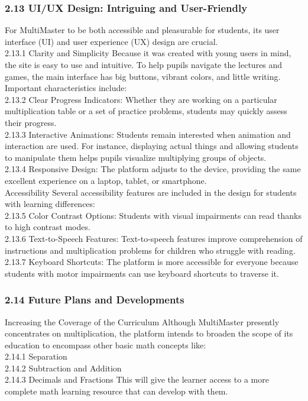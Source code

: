 \documentclass[BTech]{audiss}
\begin{document}
\subsubsection{2.13 UI/UX Design: Intriguing and User-Friendly}
For MultiMaster to be both accessible and pleasurable for students, its user interface (UI) and user experience (UX) design are crucial.\\
2.13.1 Clarity and Simplicity Because it was created with young users in mind, the site is easy to use and intuitive. To help pupils navigate the lectures and games, the main interface has big buttons, vibrant colors, and little writing. Important characteristics include:\\
2.13.2 Clear Progress Indicators: Whether they are working on a particular multiplication table or a set of practice problems, students may quickly assess their progress.\\
2.13.3 Interactive Animations: Students remain interested when animation and interaction are used. For instance, displaying actual things and allowing students to manipulate them helps pupils visualize multiplying groups of objects. \\
2.13.4 Responsive Design: The platform adjusts to the device, providing the same excellent experience on a laptop, tablet, or smartphone.\\

Accessibility Several accessibility features are included in the design for students with learning differences: \\
2.13.5 Color Contrast Options: Students with visual impairments can read thanks to high contrast modes.\\
2.13.6 Text-to-Speech Features: Text-to-speech features improve comprehension of instructions and multiplication problems for children who struggle with reading.\\
2.13.7 Keyboard Shortcuts: The platform is more accessible for everyone because students with motor impairments can use keyboard shortcuts to traverse it.
\subsubsection{2.14 Future Plans and Developments}
Increasing the Coverage of the Curriculum Although MultiMaster presently concentrates on multiplication, the platform intends to broaden the scope of its education to encompass other basic math concepts like:\\
2.14.1 Separation\\
2.14.2 Subtraction and Addition \\
2.14.3 Decimals and Fractions This will give the learner access to a more complete math learning resource that can develop with them.
\end{document}
